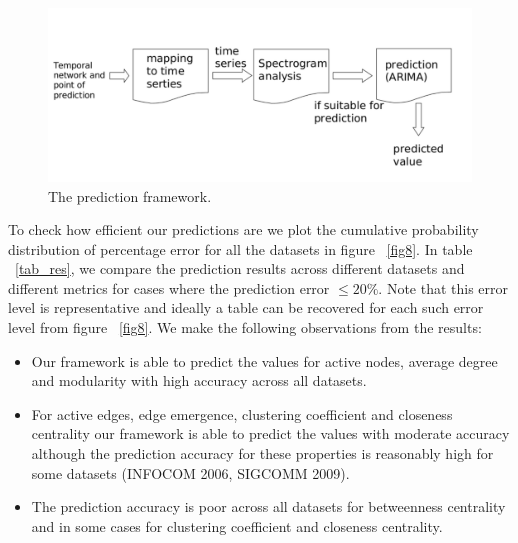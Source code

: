  
 \begin{figure}[!ht]
  \begin{center}
  \includegraphics[width=0.95\columnwidth, angle=0]{./texfiles/Chapter_1/fig/Prediction.pdf}
  \caption{\label{fig13}The prediction framework.}
  \end{center}
 \end{figure}
 
 

To check how efficient our predictions are we plot the cumulative probability distribution of percentage error for all the datasets in figure ~\ref{fig8}. 
In table ~\ref{tab_res}, we compare the prediction results across different datasets and different metrics for cases where the prediction error $\leq20\%$. 
 Note that this error level is representative and ideally a table can be recovered for each such error level from figure ~\ref{fig8}. We make the 
 following observations from the results: 
\begin{itemize}
 \item  Our framework is able to predict the values for active nodes, average degree and modularity with high accuracy across all datasets. 
 \item For active edges, edge emergence, clustering coefficient and closeness centrality our framework is able to predict the values with moderate accuracy although the 
 prediction accuracy for these properties is reasonably high for some datasets (INFOCOM 2006, SIGCOMM 2009).
 \item The prediction accuracy is poor across all datasets for betweenness centrality and in some cases for clustering coefficient and closeness centrality.
\end{itemize}


